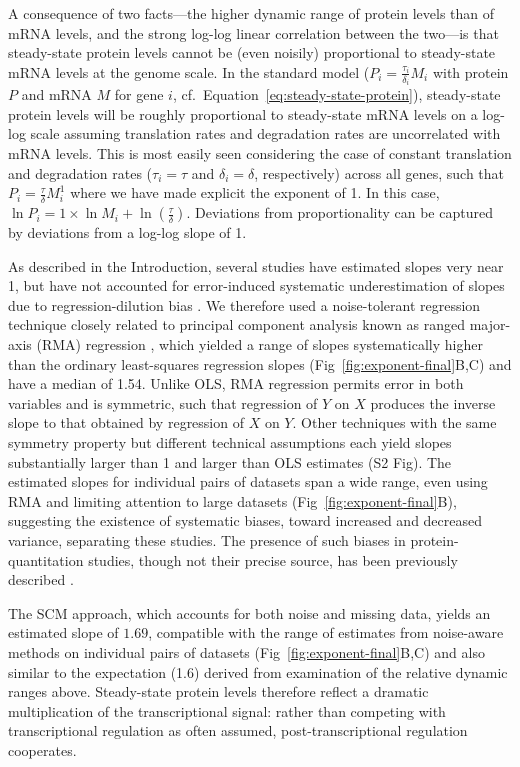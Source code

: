 \documentclass[10pt]{article}
\begin{document}
A consequence of two facts---the higher dynamic range of protein levels than of mRNA levels, and the strong log-log linear correlation between the two---is that steady-state protein levels cannot be (even noisily) proportional to
steady-state mRNA levels at the genome scale. In the standard model ($P_i = \frac{\tau_i}{\delta_i}M_i$ with protein $P$ and mRNA $M$ for gene $i$, cf.~Equation~\ref{eq:steady-state-protein}), steady-state protein levels will be roughly proportional to steady-state mRNA levels on a log-log scale assuming translation rates and degradation rates are uncorrelated with mRNA levels. This is most easily seen considering the case of constant translation and degradation rates ($\tau_i = \tau$ and $\delta_i = \delta$, respectively) across all genes, such that $P_i = \frac{\tau}{\delta}M_i^1$  where we have made explicit the exponent of 1. In this case, $\ln P_i = 1\times\ln M_i + \ln\left(\frac{\tau}{\delta}\right)$. Deviations from proportionality can be captured by deviations from a log-log slope of 1.

As described in the Introduction, several studies have estimated slopes very near 1, but have not accounted for error-induced systematic underestimation of slopes due to regression-dilution bias \cite{hutcheon10}. We therefore used a noise-tolerant regression technique closely related to principal
component analysis known as ranged major-axis (RMA) regression
\cite{legendre98}, which yielded a range of slopes systematically higher than the ordinary least-squares regression slopes (Fig~\ref{fig:exponent-final}B,C) and have a median of 1.54. Unlike OLS, RMA regression permits error in both variables and is symmetric, such that regression of $Y$ on $X$ produces the inverse slope to that obtained by regression of $X$ on $Y$. Other techniques with the same symmetry property but different technical assumptions each yield slopes substantially larger than 1
and larger than OLS estimates 
(S2 Fig). The estimated slopes for individual pairs of datasets span a wide range, even using RMA and limiting attention to large datasets (Fig~\ref{fig:exponent-final}B), suggesting the existence of systematic biases, toward increased and decreased variance, separating these studies. The presence of such biases in protein-quantitation studies, though not their precise source, has been previously described \cite{Ahrne2013}.

The SCM approach, which accounts for both noise and missing data, yields an estimated slope of \(1.69\), compatible with the range of estimates from noise-aware methods on individual pairs of datasets (Fig~\ref{fig:exponent-final}B,C) and also similar to the expectation (1.6) derived from examination of the relative dynamic ranges above. Steady-state protein levels 
therefore reflect a dramatic multiplication of the transcriptional signal: rather than competing with transcriptional regulation as often assumed, post-transcriptional regulation cooperates.
\end{document}
